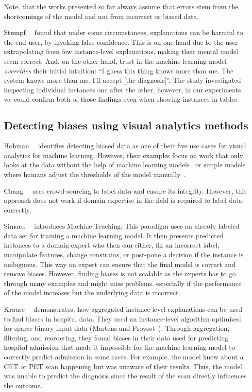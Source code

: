 Note, that the works presented so far always assume that errors stem from the shortcomings of the model and not from incorrect or biased data.

Stumpf~\etal~\cite{harmful} found that under some circumstances, explanations can be harmful to the end user, by invoking false confidence.
This is on one hand due to the user extrapolating from few instance-level explanations, making their mental model seem correct.
And, on the other hand, trust in the machine learning model \emph{overrides} their initial intuition: ``I guess this thing knows more than me. The system knows more than me. I'll accept [the diagnosis]''.
The study investigated inspecting individual instances one after the other, however,
in our experiments we could confirm both of those findings even when showing instances in tables.

\subsection{Detecting biases using visual analytics methods}
Hohman~\etal~\cite{2018arXiv180106889H} identifies detecting biased data as one of their five use cases for visual analytics for machine learning.
However, their examples focus on work that only looks at the data without the help of machine learning models~\cite{facets} or simple models where humans adjust the thresholds of the model manually~\cite{wattenberg}.

Chang~\etal~\cite{revolt-collaborative-crowdsourcing-labeling-machine-learning-datasets} uses crowd-sourcing to label data and ensure its integrity.
However, this approach does not work if domain expertise in the field is required to label data correctly.

Simard~\etal~\cite{DBLP:journals/corr/SimardACPGMRSVW17} introduces Machine Teaching.
This paradigm uses an already labeled data set for training a machine learning model.
It then presents predicted instances to a domain expert who then can either, fix an incorrect label, manipulate features, change constrains, or post-pone a decision if the instance is ambiguous.
This way an expert can ensure that the final model is correct and remove biases.
However, finding biases is not scalable as the experts has to go through many examples and might miss problems, especially if the performance of the model increases but the underlying data is incorrect.

Krause~\etal~\cite{explainer} demonstrates, how aggregated instance-level explanations can be used to find biases in hospital data.
They used an instance-level algorithm optimized for sparse binary input data (Martens and Provost~\cite{Martens:2014:EDD:2600518.2600523}).
Through aggregation, filtering, and reordering, they found biases in their data used for predicting hospital admission that made it impossible for the machine learning model to correctly predict admission in some cases.
For example, the model knew about a CET or PET scan happening but was unaware of their results.
Thus, the model was unable to predict the diagnosis since the result of the scan directly influences the outcome.



